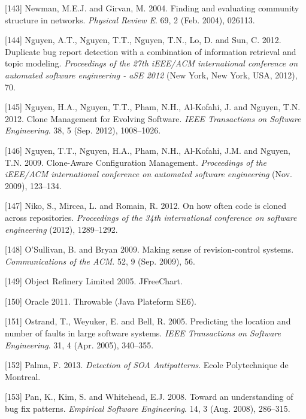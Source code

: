 \documentclass[12pt]{report}
\begin{document}
\hypertarget{ref-Newman2004}{}
{[}143{]} Newman, M.E.J. and Girvan, M. 2004. Finding and evaluating
community structure in networks. \emph{Physical Review E}. 69, 2 (Feb.
2004), 026113.

\hypertarget{ref-Nguyen2012}{}
{[}144{]} Nguyen, A.T., Nguyen, T.T., Nguyen, T.N., Lo, D. and Sun, C.
2012. Duplicate bug report detection with a combination of information
retrieval and topic modeling. \emph{Proceedings of the 27th iEEE/ACM
international conference on automated software engineering - aSE 2012}
(New York, New York, USA, 2012), 70.

\hypertarget{ref-Nguyen2012a}{}
{[}145{]} Nguyen, H.A., Nguyen, T.T., Pham, N.H., Al-Kofahi, J. and
Nguyen, T.N. 2012. Clone Management for Evolving Software. \emph{IEEE
Transactions on Software Engineering}. 38, 5 (Sep. 2012), 1008--1026.

\hypertarget{ref-Nguyen2009}{}
{[}146{]} Nguyen, T.T., Nguyen, H.A., Pham, N.H., Al-Kofahi, J.M. and
Nguyen, T.N. 2009. Clone-Aware Configuration Management.
\emph{Proceedings of the iEEE/ACM international conference on automated
software engineering} (Nov. 2009), 123--134.

\hypertarget{ref-Niko2012}{}
{[}147{]} Niko, S., Mircea, L. and Romain, R. 2012. On how often code is
cloned across repositories. \emph{Proceedings of the 34th international
conference on software engineering} (2012), 1289--1292.

\hypertarget{ref-OSullivan2009}{}
{[}148{]} O'Sullivan, B. and Bryan 2009. Making sense of
revision-control systems. \emph{Communications of the ACM}. 52, 9 (Sep.
2009), 56.

\hypertarget{ref-ObjectRefineryLimited2005}{}
{[}149{]} Object Refinery Limited 2005. JFreeChart.

\hypertarget{ref-Oracle2011}{}
{[}150{]} Oracle 2011. Throwable (Java Plateform SE6).

\hypertarget{ref-Ostrand2005}{}
{[}151{]} Ostrand, T., Weyuker, E. and Bell, R. 2005. Predicting the
location and number of faults in large software systems. \emph{IEEE
Transactions on Software Engineering}. 31, 4 (Apr. 2005), 340--355.

\hypertarget{ref-Palma2013}{}
{[}152{]} Palma, F. 2013. \emph{Detection of SOA Antipatterns}. Ecole
Polytechnique de Montreal.

\hypertarget{ref-Pan2008}{}
{[}153{]} Pan, K., Kim, S. and Whitehead, E.J. 2008. Toward an
understanding of bug fix patterns. \emph{Empirical Software
Engineering}. 14, 3 (Aug. 2008), 286--315.
\end{document}

